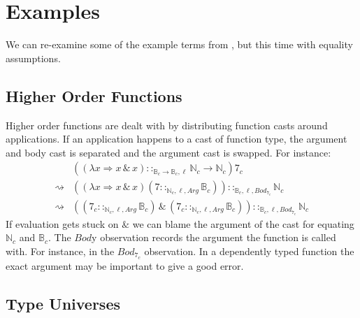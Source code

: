 \section{Examples}
We can re-examine some of the example terms from , but this time with equality assumptions.
 
\subsection{Higher Order Functions}
 
Higher order functions are dealt with by distributing function casts around applications.
If an application happens to a cast of function type, the argument and body cast is separated and the argument cast is swapped.
For instance:
\begin{align*}
\, & \left(\left(\lambda x\Rightarrow x\,\&\,x\right)::_{\mathbb{B}_c \rightarrow\mathbb{B}_c , \ell}\mathbb{N}_c \rightarrow\mathbb{N}_c \right) 7_c\\
\rightsquigarrow & \left(\left(\lambda x\Rightarrow x\,\&\,x\right)\left(7::_{\mathbb{N}_c , \ell, Arg}\mathbb{B}_c \right)\right)::_{\mathbb{B}_c , \ell, Bod_{7_c}}\mathbb{N}_c \\
\rightsquigarrow & \left(\left(7_c ::_{\mathbb{N}_c , \ell, Arg}\mathbb{B}_c \right)\,\&\,\left(7_c ::_{\mathbb{N}_c , \ell, Arg}\mathbb{B}_c \right)\right) ::_{\mathbb{B}_c , \ell, Bod_{7_c}}\mathbb{N}_c 
\end{align*}
If evaluation gets stuck on $\&$ we can blame the argument of the cast for equating $\mathbb{N}_c$ and $\mathbb{B}_c$.
The $Bod$y observation records the argument the function is called with.
For instance, in the $Bod_{7_c}$ observation.
In a dependently typed function the exact argument may be important to give a good error.

\subsection{Type Universes}
 
